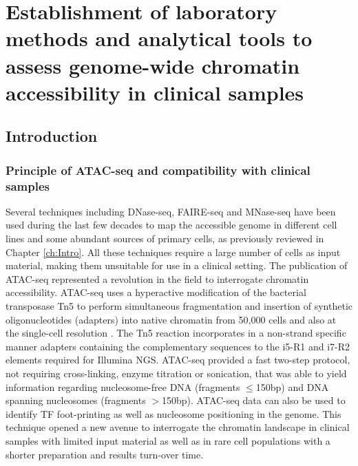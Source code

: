 \chapter{Establishment of laboratory methods and analytical tools to assess genome-wide chromatin accessibility in clinical samples}
\label{ch:Results1}


\section{Introduction}
\subsection{Principle of ATAC-seq and compatibility with clinical samples}
Several techniques including DNase-seq, FAIRE-seq and MNase-seq have been used during the last few decades to map the accessible genome in different cell lines and some abundant sources of primary cells, as previously reviewed in Chapter \ref{ch:Intro}. All these techniques require a large number of cells as input material, making them unsuitable for use in a clinical setting. The publication of ATAC-seq represented a revolution in the field to interrogate chromatin accessibility. ATAC-seq uses a hyperactive modification of the bacterial transposase Tn5 to perform simultaneous fragmentation and insertion of synthetic oligonucleotides (adapters) into native chromatin from 50,000 cells and also at the single-cell resolution \parencite{Buenrostro2013, Buenrostro2015}. The Tn5 reaction incorporates in a non-strand specific manner adapters containing the complementary sequences to the i5-R1 and i7-R2 elements required for Illumina NGS. ATAC-seq provided a fast two-step protocol, not requiring cross-linking, enzyme titration or sonication, that was able to yield information regarding nucleosome-free DNA (fragments $\leq$150bp) and DNA spanning nucleosomes (fragments $>$150bp). ATAC-seq data can also be used to identify TF foot-printing as well as nucleosome positioning in the genome. This technique opened a new avenue to interrogate the chromatin landscape in clinical samples with limited input material as well as in rare cell populations with a shorter preparation and results turn-over time.



